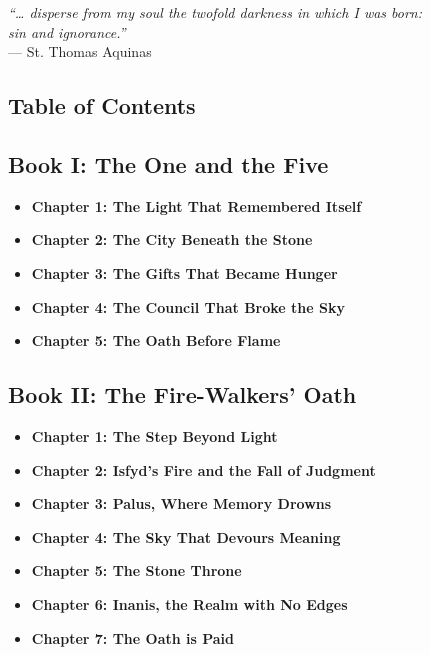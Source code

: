\documentclass[12pt]{article}
\begin{document}


\newpage

\begin{titlepage}
\vspace*{\fill}
\begin{center}
\emph{“… disperse from my soul the twofold darkness in which I was born:} \\
\emph{sin and ignorance.”} \\
\vspace{1em}
— St. Thomas Aquinas
\end{center}
\vspace*{\fill}
\end{titlepage}


\newpage

\begin{titlepage}
\section*{Table of Contents}

\vspace{.5in}

\subsection*{Book I: The One and the Five}
\begin{itemize}
  \item \textbf{Chapter 1: The Light That Remembered Itself}
  \item \textbf{Chapter 2: The City Beneath the Stone}
  \item \textbf{Chapter 3: The Gifts That Became Hunger}
  \item \textbf{Chapter 4: The Council That Broke the Sky}
  \item \textbf{Chapter 5: The Oath Before Flame}
\end{itemize}

\vspace{.5in}

\subsection*{Book II: The Fire-Walkers’ Oath}
\begin{itemize}
  \item \textbf{Chapter 1: The Step Beyond Light}
  \item \textbf{Chapter 2: Isfyd’s Fire and the Fall of Judgment}
  \item \textbf{Chapter 3: Palus, Where Memory Drowns}
  \item \textbf{Chapter 4: The Sky That Devours Meaning}
  \item \textbf{Chapter 5: The Stone Throne}
  \item \textbf{Chapter 6: Inanis, the Realm with No Edges}
  \item \textbf{Chapter 7: The Oath is Paid}
\end{itemize}
\end{titlepage}
\end{document}
